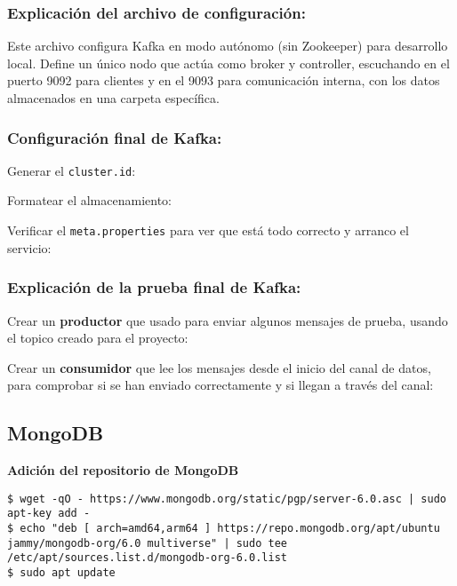 \documentclass{../../../miPlantilla}
\begin{document}
\newpage

\subsubsection*{Explicación del archivo de configuración:}

Este archivo configura Kafka en modo autónomo (sin Zookeeper) para desarrollo local. Define un único nodo que actúa como broker y controller,
escuchando en el puerto 9092 para clientes y en el 9093 para comunicación interna, con los datos almacenados en una carpeta específica.

\subsubsection*{Configuración final de Kafka:}

Generar el \texttt{cluster.id}:

Formatear el almacenamiento:

Verificar el \texttt{meta.properties} para ver que está todo correcto y arranco el servicio:

\newpage

\subsubsection*{Explicación de la prueba final de Kafka:}

Crear un \textbf{productor} que usado para enviar algunos mensajes de prueba, usando el topico creado para el proyecto:

Crear un \textbf{consumidor} que lee los mensajes desde el inicio del canal de datos, para comprobar si se han enviado correctamente y si 
llegan a través del canal:

\subsection{MongoDB}
\label{anexo:mongo}

\textbf{Adición del repositorio de MongoDB}

\begin{lstlisting}
$ wget -qO - https://www.mongodb.org/static/pgp/server-6.0.asc | sudo apt-key add -
$ echo "deb [ arch=amd64,arm64 ] https://repo.mongodb.org/apt/ubuntu jammy/mongodb-org/6.0 multiverse" | sudo tee /etc/apt/sources.list.d/mongodb-org-6.0.list
$ sudo apt update
\end{lstlisting}
\end{document}
